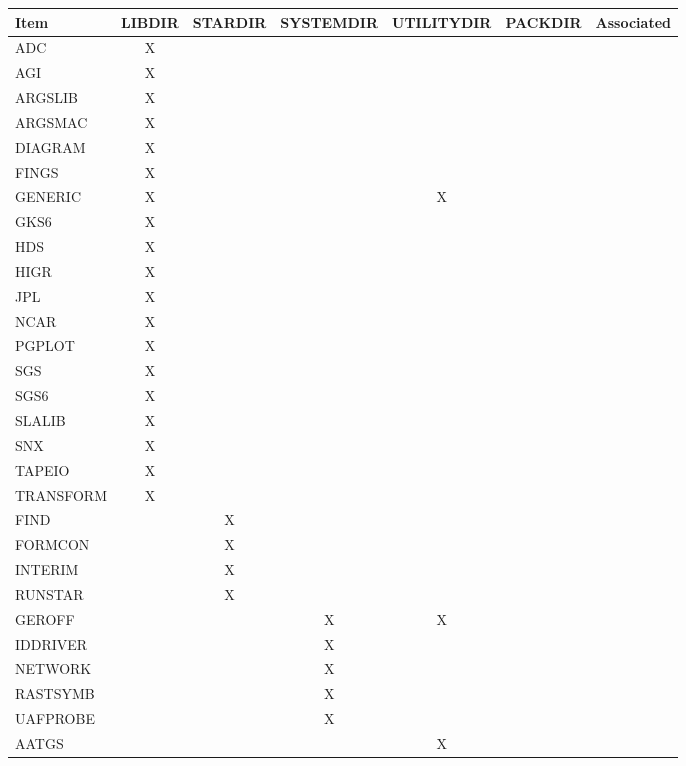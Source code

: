 {\scriptsize
\begin{table}
\begin{center}
\begin{tabular}{||l||c|c|c|c|c||c||} \hline
{\bf Item} & {\bf LIBDIR} & {\bf STARDIR} & {\bf SYSTEMDIR} &  {\bf UTILITYDIR}
 & {\bf PACKDIR} & {\bf Associated} \\
\hline
\hline
ADC       & X &   &   &   &   &   \\
AGI       & X &   &   &   &   &   \\
ARGSLIB   & X &   &   &   &   &   \\
ARGSMAC   & X &   &   &   &   &   \\
DIAGRAM   & X &   &   &   &   &   \\
FINGS     & X &   &   &   &   &   \\
GENERIC   & X &   &   & X &   &   \\
GKS6      & X &   &   &   &   &   \\
HDS       & X &   &   &   &   &   \\
HIGR      & X &   &   &   &   &   \\
JPL       & X &   &   &   &   &   \\
NCAR      & X &   &   &   &   &   \\
PGPLOT    & X &   &   &   &   &   \\
SGS       & X &   &   &   &   &   \\
SGS6      & X &   &   &   &   &   \\
SLALIB    & X &   &   &   &   &   \\
SNX       & X &   &   &   &   &   \\
TAPEIO    & X &   &   &   &   &   \\
TRANSFORM & X &   &   &   &   &   \\
\hline
FIND      &   & X &   &   &   &   \\
FORMCON   &   & X &   &   &   &   \\
INTERIM   &   & X &   &   &   &   \\
RUNSTAR   &   & X &   &   &   &   \\
\hline
GEROFF    &   &   & X & X &   &   \\
IDDRIVER  &   &   & X &   &   &   \\
NETWORK   &   &   & X &   &   &   \\
RASTSYMB  &   &   & X &   &   &   \\
UAFPROBE  &   &   & X &   &   &   \\
\hline
AATGS     &   &   &   & X &   &   \\

\end{tabular}
\end{center}
\end{table}}
